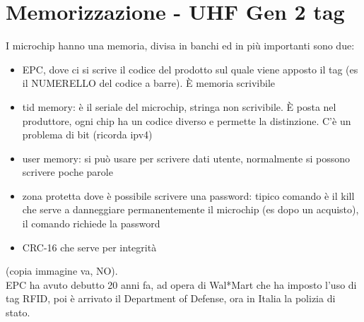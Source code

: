 \documentclass[oneside, 12pt]{extbook}
\begin{document}
\section{Memorizzazione - UHF Gen 2 tag}
I microchip hanno una memoria, divisa in banchi ed in più importanti sono due:
\begin{itemize}
	\item EPC, dove ci si scrive il codice del prodotto sul quale viene apposto il tag (es il NUMERELLO del codice a barre). È memoria scrivibile
	\item tid memory: è il seriale del microchip, stringa non scrivibile. È posta nel produttore, ogni chip ha un codice diverso e permette la distinzione. C'è un problema di bit (ricorda ipv4)
	\item user memory: si può usare per scrivere dati utente, normalmente si possono scrivere poche parole
	\item zona protetta dove è possibile scrivere una password: tipico comando è il kill che serve a danneggiare permanentemente il microchip (es dopo un acquisto), il comando richiede la password
	\item CRC-16 che serve per integrità
\end{itemize}
(copia immagine va, NO).\\EPC ha avuto debutto 20 anni fa, ad opera di Wal*Mart che ha imposto l'uso di tag RFID, poi è arrivato il Department of Defense, ora in Italia la polizia di stato.
\end{document}
